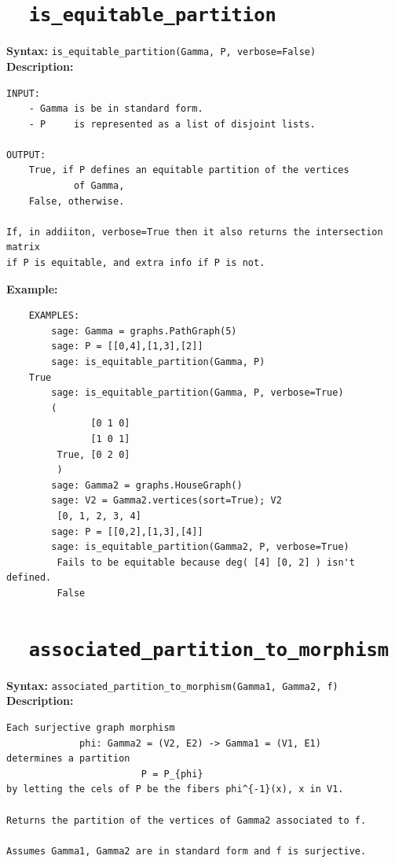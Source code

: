 \documentclass{article}
\begin{document}
\section{\tt \ \ is\_equitable\_partition}

\textbf{Syntax:} \verb}is_equitable_partition(Gamma, P, verbose=False)}\\

\textbf{Description:}
\begin{verbatim}
INPUT:
    - Gamma is be in standard form.
    - P     is represented as a list of disjoint lists.

OUTPUT:
    True, if P defines an equitable partition of the vertices
            of Gamma,
    False, otherwise.

If, in addiiton, verbose=True then it also returns the intersection matrix
if P is equitable, and extra info if P is not. 

\end{verbatim}

\textbf{Example:}
\begin{verbatim}
    EXAMPLES:
        sage: Gamma = graphs.PathGraph(5)
        sage: P = [[0,4],[1,3],[2]]
        sage: is_equitable_partition(Gamma, P)
	True
        sage: is_equitable_partition(Gamma, P, verbose=True)
        (
               [0 1 0]
               [1 0 1]
         True, [0 2 0]
         )
        sage: Gamma2 = graphs.HouseGraph()   
        sage: V2 = Gamma2.vertices(sort=True); V2
         [0, 1, 2, 3, 4]
        sage: P = [[0,2],[1,3],[4]] 
        sage: is_equitable_partition(Gamma2, P, verbose=True)   
         Fails to be equitable because deg( [4] [0, 2] ) isn't defined.
         False
\end{verbatim}


\section{\tt \ \ associated\_partition\_to\_morphism}

\textbf{Syntax:} \verb}associated_partition_to_morphism(Gamma1, Gamma2, f)}\\

\textbf{Description:}
\begin{verbatim}
Each surjective graph morphism
             phi: Gamma2 = (V2, E2) -> Gamma1 = (V1, E1)
determines a partition
                        P = P_{phi}
by letting the cels of P be the fibers phi^{-1}(x), x in V1.

Returns the partition of the vertices of Gamma2 associated to f.

Assumes Gamma1, Gamma2 are in standard form and f is surjective.
\end{verbatim}
\end{document}
